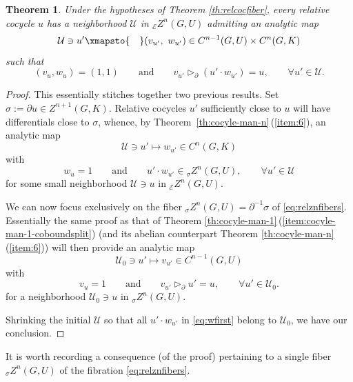 \documentclass[10pt,a4paper]{amsart}
\numberwithin{equation}{section}
\newtheorem{Theorem}{Theorem}[section]
\newcommand\cE{{\mathcal E}}
\newcommand\cU{{\mathcal U}}
\begin{document}
\begin{Theorem}\label{th:canconjrel}
 Under the hypotheses of Theorem {\rm \ref{th:relcocfiber}}, every relative cocycle $u$ has a neighborhood $\cU$ in ${}_{\cE}Z^n(G,U)$ admitting an analytic map
 \begin{equation*}
 \cU\ni {u'}
 \xmapsto{\quad}
 (v_{u'},\ w_{u'})\in C^{n-1}(G,U)\times C^n(G,K)
 \end{equation*}
 such that
 \begin{equation*}
 (v_{u},w_{u})=(1,1)
 \qquad\text{and}\qquad
 v_{u'}\triangleright_{\partial} (u'\cdot w_{u'}) = u,\qquad \forall u'\in \cU.
 \end{equation*}
\end{Theorem}
\begin{proof}
 This essentially stitches together two previous results. Set $\sigma:=\partial u\in Z^{n+1}(G,K)$.
 Relative cocycles $u'$ sufficiently close to $u$ will have differentials close to $\sigma$, whence, by Theorem~\ref{th:cocyle-man-n}\,(\ref{item:6}), an analytic map
 \begin{equation*}
 \cU\ni u'\mapsto w_{u'}\in C^n(G,K)
 \end{equation*}
 with
 \begin{equation}\label{eq:wfirst}
 w_{u}=1
 \qquad\text{and}\qquad
 u'\cdot w_{u'} \in {}_{\sigma}Z^n(G,U),\qquad \forall u'\in \cU
 \end{equation}
 for some small neighborhood $\cU\ni u$ in ${}_{\cE}Z^n(G,U)$.

 We can now focus exclusively on the fiber ${}_{\sigma}Z^n(G,U) = \partial^{-1}\sigma$ of \eqref{eq:relznfibers}. Essentially the same proof as that of Theorem \ref{th:cocyle-man-1}\,(\ref{item:cocyle-man-1-coboundsplit}) (and its abelian counterpart Theorem \ref{th:cocyle-man-n}\,(\ref{item:6})) will then provide an analytic map
 \begin{equation*}
 \cU_0\ni u'\mapsto v_{u'}\in C^{n-1}(G,U)
 \end{equation*}
 with
 \begin{equation*}
 v_{u}=1
 \qquad\text{and}\qquad
 v_{u'}\triangleright_{\partial} u' = u,\qquad \forall u'\in \cU_0.
 \end{equation*}
 for a neighborhood $\cU_0\ni u$ in ${}_{\sigma}Z^n(G,U)$.

 Shrinking the initial $\cU$ so that all $u'\cdot w_{u'}$ in \eqref{eq:wfirst} belong to $\cU_0$, we have our conclusion.
\end{proof}

It is worth recording a consequence (of the proof) pertaining to a single fiber ${}_{\sigma}Z^n(G,U)$ of the fibration \eqref{eq:relznfibers}.
\end{document}
